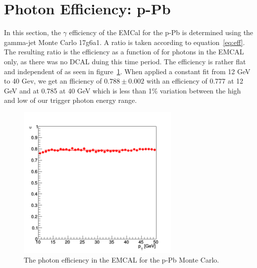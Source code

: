 \label{sec:EfficiencyAppendix}
\section{Photon Efficiency: p-Pb}
In this section, the $\gamma$ efficiency of the EMCal for the p-Pb is determined using the gamma-jet Monte Carlo 17g6a1. A ratio is taken according to equation~\ref{eq:eff}. The resulting ratio is the efficiency as a function of \pt for photons in the EMCAL only, as there was no DCAL duing this time period. The efficiency is rather flat and independent of \pt as seen in figure~\ref{fig:photonEff_pPb}. When applied a constant fit from 12 GeV to 40 Gev, we get an fficiency of $0.788 \pm 0.002$ with an efficiency of 0.777 at 12 GeV and at 0.785 at 40 GeV which is less than 1\% variation between the high and low of our trigger photon energy range. 
\begin{figure}
\centering
\includegraphics[width=0.7\textwidth]{EfficiencyAppendix/Efficiency_photon_pPb.png}
\caption{The photon efficiency in the EMCAL for the p-Pb Monte Carlo.}
\label{fig:photonEff_pPb}
\end{figure}


